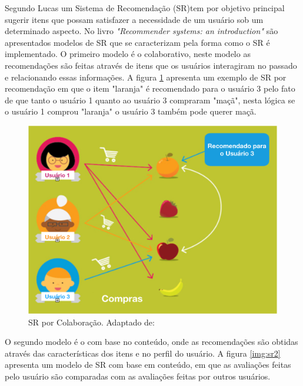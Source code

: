Segundo Lucas \cite{brunialti2015aprendizado} um Sistema de Recomendação (SR)tem por objetivo principal sugerir itens que possam satisfazer a necessidade de um usuário sob um determinado aspecto. No livro \textit{"Recommender systems: an introduction"} \cite{jannach2010recommender} são apresentados modelos de SR que se caracterizam pela forma como o SR é implementado. O primeiro modelo é o colaborativo, neste modelo as recomendações são feitas através de itens que os usuários interagiram no passado e relacionando essas informações. A figura \ref{img:sr1} apresenta um exemplo de SR por recomendação em que o item "laranja" é recomendado para o usuário 3 pelo fato de que tanto o usuário 1 quanto ao usuário 3 compraram "maçã", nesta lógica se o usuário 1 comprou "laranja" o usuário 3 também pode querer maçã. 

\graphicspath{{figuras/}}
\begin{figure}[h!]
\centering
\includegraphics[scale=0.60]{sr1.png}
\caption{SR por Colaboração. Adaptado de: \cite{sarwar2001item}}
\label{img:sr1}
\end{figure}

O segundo modelo é o com base no conteúdo, onde as recomendações são obtidas através das características dos itens e no perfil do usuário. A figura \ref{img:sr2} apresenta um modelo de SR com base em conteúdo, em que as avaliações feitas pelo usuário são comparadas com as avaliações feitas por outros usuários.

